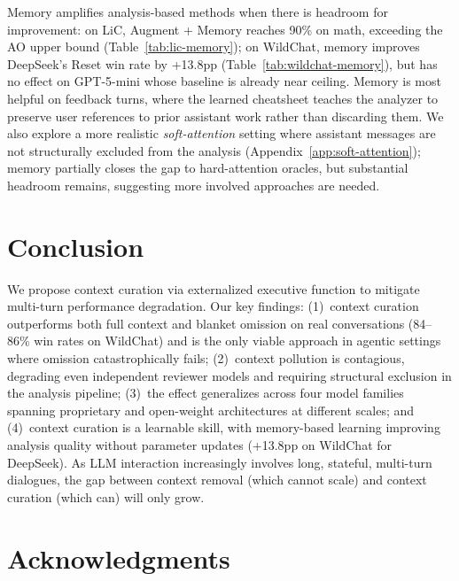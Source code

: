 \documentclass{article} %
\begin{document}
Memory amplifies analysis-based methods when there is headroom for improvement: on LiC, Augment + Memory reaches 90\% on math, exceeding the AO upper bound (Table~\ref{tab:lic-memory}); on WildChat, memory improves DeepSeek's Reset win rate by +13.8pp (Table~\ref{tab:wildchat-memory}), but has no effect on GPT-5-mini whose baseline is already near ceiling. Memory is most helpful on feedback turns, where the learned cheatsheet teaches the analyzer to preserve user references to prior assistant work rather than discarding them. We also explore a more realistic \emph{soft-attention} setting where assistant messages are not structurally excluded from the analysis (Appendix~\ref{app:soft-attention}); memory partially closes the gap to hard-attention oracles, but substantial headroom remains, suggesting more involved approaches are needed.




\section{Conclusion}
\label{sec:conclusion}

We propose context curation via externalized executive function to mitigate multi-turn performance degradation. Our key findings: (1)~context curation outperforms both full context and blanket omission on real conversations (84--86\% win rates on WildChat) and is the only viable approach in agentic settings where omission catastrophically fails; (2)~context pollution is contagious, degrading even independent reviewer models and requiring structural exclusion in the analysis pipeline; (3)~the effect generalizes across four model families spanning proprietary and open-weight architectures at different scales; and (4)~context curation is a learnable skill, with memory-based learning improving analysis quality without parameter updates (+13.8pp on WildChat for DeepSeek). As LLM interaction increasingly involves long, stateful, multi-turn dialogues, the gap between context removal (which cannot scale) and context curation (which can) will only grow.


\section*{Acknowledgments}
\end{document}
